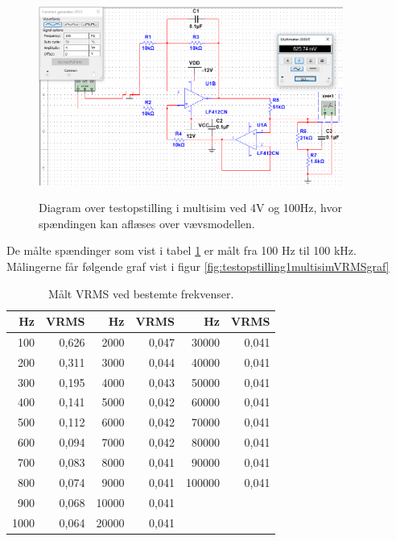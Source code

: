 \begin{figure}[H]
\centering
{\includegraphics[width=10cm]
{Figure/testopstilling1multisimRMS}}
\caption{Diagram over testopstilling i multisim ved 4V og 100Hz, hvor spændingen kan aflæses over vævsmodellen.}
\label{fig:testopstilling1multisimRMS}
\end{figure}

De målte spændinger som vist i tabel \ref{table:frekvenservrms} er målt fra 100 Hz til 100 kHz.  Målingerne får følgende graf vist i figur \ref{fig:testopstilling1multisimVRMSgraf} 

\begin{table}[H]
\centering
\begin{tabular}{| r | r || r | r || r | r |}
    \hline
    \textbf{Hz} & \textbf{VRMS} & \textbf{Hz} & \textbf{VRMS} & \textbf{Hz} & \textbf{VRMS}\\ \hline
    100 & 0,626 & 2000 & 0,047 & 30000 & 0,041 \\ \hline
    200 & 0,311 & 3000 & 0,044 & 40000 & 0,041   \\ \hline
    300 & 0,195 & 4000 & 0,043 & 50000 & 0,041   \\ \hline
    400 & 0,141 & 5000 & 0,042 & 60000 & 0,041   \\ \hline
    500 & 0,112 & 6000 & 0,042 & 70000 & 0,041  \\ \hline
    600 & 0,094 & 7000 & 0,042 & 80000 & 0,041   \\ \hline
    700 & 0,083 & 8000 & 0,041 & 90000 & 0,041  \\ \hline
    800 & 0,074 & 9000 & 0,041 & 100000 & 0,041   \\ \hline
    900 & 0,068 & 10000 & 0,041 &  &     \\ \hline
    1000 & 0,064 & 20000 & 0,041 & &   \\ \hline
\end{tabular}
    \caption{Målt VRMS ved bestemte frekvenser.}
    \label{table:frekvenservrms}
\end{table} 


